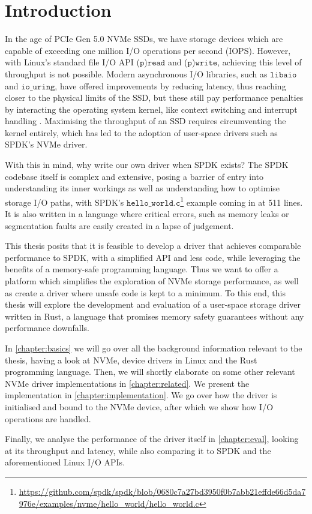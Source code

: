 \chapter{Introduction}\label{chapter:introduction}
In the age of PCIe Gen 5.0 NVMe SSDs, we have storage devices which are capable of exceeding one million I/O operations per second (IOPS). However, with Linux's standard file I/O API ($\texttt{p}$)$\texttt{read}$ and ($\texttt{p}$)$\texttt{write}$, achieving this level of throughput is not possible. Modern asynchronous I/O libraries, such as $\texttt{libaio}$ and $\texttt{io\_uring}$, have offered improvements by reducing latency, thus reaching closer to the physical limits of the SSD, but these still pay performance penalties by interacting the operating system kernel, like context switching and interrupt handling \cite{storage_api}. Maximising the throughput of an SSD requires circumventing the kernel entirely, which has led to the adoption of user-space drivers such as SPDK's NVMe driver.

With this in mind, why write our own driver when SPDK exists? The SPDK codebase itself is complex and extensive, posing a barrier of entry into understanding its inner workings as well as understanding how to optimise storage I/O paths, with SPDK's $\texttt{hello\_world.c}$\footnote{\url{https://github.com/spdk/spdk/blob/0680c7a27bd3950f0b7abb21effde66d5da7976e/examples/nvme/hello_world/hello_world.c}} example coming in at 511 lines. It is also written in a language where critical errors, such as memory leaks or segmentation faults are easily created in a lapse of judgement.

This thesis posits that it is feasible to develop a driver that achieves comparable performance to SPDK, with a simplified API and less code, while leveraging the benefits of a memory-safe programming language. Thus we want to offer a platform which simplifies the exploration of NVMe storage performance, as well as create a driver where unsafe code is kept to a minimum. To this end, this thesis will explore the development and evaluation of a user-space storage driver written in Rust, a language that promises memory safety guarantees without any performance downfalls.

In \autoref{chapter:basics} we will go over all the background information relevant to the thesis, having a look at NVMe, device drivers in Linux and the Rust programming language. Then, we will shortly elaborate on some other relevant NVMe driver implementations in \autoref{chapter:related}.
We present the implementation in \autoref{chapter:implementation}. We go over how the driver is initialised and bound to the NVMe device, after which we show how I/O operations are handled.

Finally, we analyse the performance of the driver itself in \autoref{chapter:eval}, looking at its throughput and latency, while also comparing it to SPDK and the aforementioned Linux I/O APIs.
